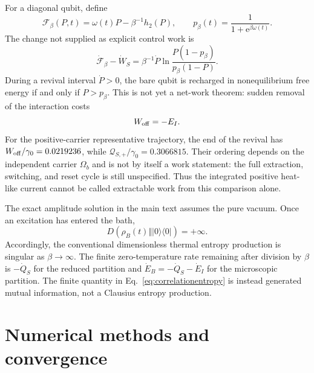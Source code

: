 \documentclass[reprint,superscriptaddress,floatfix,amsmath,amssymb,prresearch,aps]{revtex4-2}
\newcommand{\ee}{\mathrm{e}}
\begin{document}
For a diagonal qubit, define
\begin{equation}
\mathcal F_\beta(P,t)=\omega(t)P-\beta^{-1}h_2(P),
\qquad
p_\beta(t)=\frac1{1+\ee^{\beta\omega(t)}}.
\end{equation}
The change not supplied as explicit control work is
\begin{equation}
\dot{\mathcal F}_\beta-\dot W_S
=\beta^{-1}\dot P
\ln\frac{P(1-p_\beta)}{p_\beta(1-P)}.
\label{eq:freeenergycriterion}
\end{equation}
During a revival interval \(\dot P>0\), the bare qubit is recharged in
nonequilibrium free energy if and only if \(P>p_\beta\). This is not yet a
net-work theorem: sudden removal of the interaction costs
\begin{equation}
W_{\rm off}=-E_I.
\end{equation}
For the positive-carrier representative trajectory, the end of the revival
has \(W_{\rm off}/\gamma_0=0.0219236\), while
\(\mathcal Q_{S,+}/\gamma_0=0.3066815\). Their ordering depends on
the independent carrier \(\Omega_b\) and is not by itself a work statement:
the full extraction, switching, and reset cycle is still unspecified. Thus
the integrated positive heat-like current cannot be called extractable work from this
comparison alone.

The exact amplitude solution in the main text assumes the pure vacuum. Once
an excitation has entered the bath,
\begin{equation}
D(\rho_B(t)\Vert |0\rangle\langle0|)=+\infty.
\end{equation}
Accordingly, the conventional dimensionless thermal entropy production is
singular as \(\beta\to\infty\). The finite zero-temperature rate remaining
after division by \(\beta\) is \(-\dot Q_S\) for the reduced partition and
\(\dot E_B=-\dot Q_S-\dot E_I\) for the microscopic partition. The finite
quantity in Eq.~\eqref{eq:correlationentropy} is instead generated mutual
information, not a Clausius entropy production.

\section{Numerical methods and convergence}
\label{app:numerics}
\end{document}
